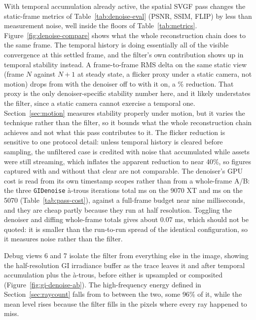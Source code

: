 With temporal accumulation already active, the spatial SVGF pass changes the static-frame metrics of
Table~\ref{tab:denoise-eval}
(PSNR, SSIM, FLIP) by less than measurement noise, well inside the floors of
Table~\ref{tab:metrics}. Figure~\ref{fig:denoise-compare} shows what the whole reconstruction
chain does to the same frame. The temporal history is doing essentially all of
the visible convergence at this settled frame, and the filter's own contribution shows up in temporal
stability instead. A frame-to-frame RMS delta on the same static view (frame $N$ against $N{+}1$ at
steady state, a flicker proxy under a static camera, not motion) drops from \flickerOff{} with
the denoiser off to \flickerOn{} with it on, a \flickerPct\% reduction. That proxy is the only
denoiser-specific stability number here, and it likely understates the filter, since a static camera
cannot exercise a temporal one. Section~\ref{sec:motion} measures stability properly under motion,
but it varies the technique rather than the filter, so it bounds what the whole reconstruction chain
achieves and not what this pass contributes to it. The flicker reduction is sensitive to
one protocol detail: unless temporal history is cleared before sampling, the unfiltered case is
credited with noise that accumulated while assets were still streaming, which inflates the apparent
reduction to near 40\%, so figures captured with and without that clear are not comparable. The
denoiser's GPU cost is read from its own timestamp scopes rather than from a whole-frame A/B: the
three \texttt{GIDenoise} à-trous iterations total \perfDenoiseAMD{} ms on the 9070 XT and
\perfDenoiseNV{} ms on the 5070 (Table~\ref{tab:pass-cost}), against a full-frame budget near nine
milliseconds, and they are cheap partly because they run at half resolution. Toggling the denoiser
and diffing whole-frame totals gives about 0.07 ms, which should not be quoted: it is smaller than
the run-to-run spread of the identical configuration, so it measures noise rather than the filter.

Debug views 6 and 7 isolate the filter from everything else in the image, showing the half-resolution
GI irradiance buffer as the trace leaves it and after temporal accumulation plus the à-trous, before
either is upsampled or composited (Figure~\ref{fig:gi-denoise-ab}). The high-frequency energy defined
in Section~\ref{sec:raycount} falls from \hfGiRaw{} to \hfGiDenoised{} between the two, some 96\% of
it, while the mean level rises because the filter fills in the pixels where every ray happened to
miss.

